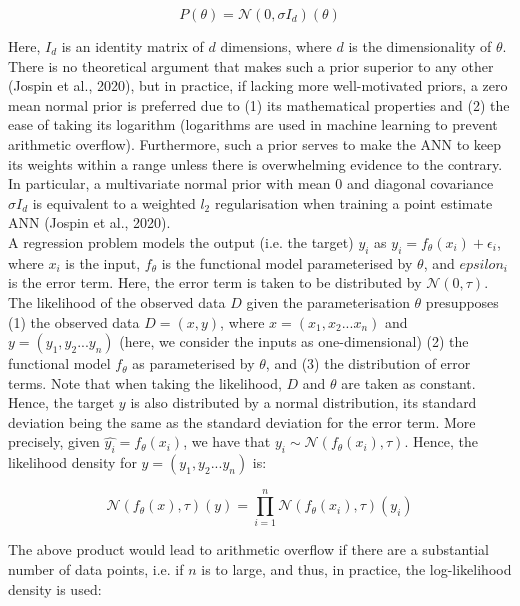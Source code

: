 \documentclass[conference]{IEEEtran}
\begin{document}
\begin{equation*}
	P(\theta) = \mathcal{N}(0, \sigma I_d)(\theta)
\end{equation*}

Here, $I_d$ is an identity matrix of $d$ dimensions, where $d$ is the dimensionality of $\theta$. There is no theoretical argument that makes such a prior superior to any other (Jospin et al., 2020), but in practice, if lacking more well-motivated priors, a zero mean normal prior is preferred due to (1) its mathematical properties and (2) the ease of taking its logarithm (logarithms are used in machine learning to prevent arithmetic overflow). Furthermore, such a prior serves to make the ANN to keep its weights within a range unless there is overwhelming evidence to the contrary. In particular, a multivariate normal prior with mean $0$ and diagonal covariance $\sigma I_d$ is equivalent to a weighted $l_2$ regularisation when training a point estimate ANN (Jospin et al., 2020).\\

A regression problem models the output (i.e. the target) $y_i$ as $y_i = f_\theta(x_i) + \epsilon_i$, where $x_i$ is the input, $f_\theta$ is the functional model parameterised by $\theta$, and $epsilon_i$ is the error term. Here, the error term is taken to be distributed by $\mathcal{N}(0, \tau)$. The likelihood of the observed data $D$ given the parameterisation $\theta$ presupposes (1) the observed data $D = (x, y)$, where $x = (x_1, x_2 ... x_n)$ and $y = (y_1, y_2... y_n)$ (here, we consider the inputs as one-dimensional) (2) the functional model $f_\theta$ as parameterised by $\theta$, and (3) the distribution of error terms. Note that when taking the likelihood, $D$ and $\theta$ are taken as constant. Hence, the target $y$ is also distributed by a normal distribution, its standard deviation being the same as the standard deviation for the error term. More precisely, given $\hat{y_i} = f_\theta(x_i)$, we have that $y_i \sim \mathcal{N}(f_\theta(x_i), \tau)$. Hence, the likelihood density for $y = (y_1, y_2... y_n)$ is:

\begin{equation*}
	\mathcal{N}(f_\theta(x), \tau)(y) = \prod_{i=1}^n \mathcal{N}(f_\theta(x_i), \tau)(y_i)
\end{equation*}

The above product would lead to arithmetic overflow if there are a substantial number of data points, i.e. if $n$ is to large, and thus, in practice, the log-likelihood density is used:
\end{document}
